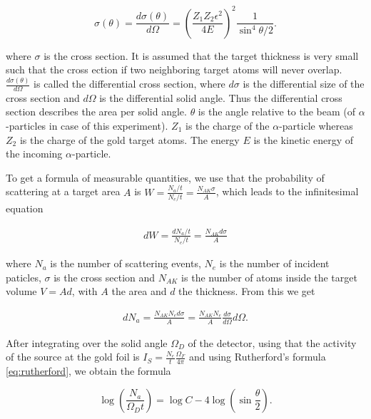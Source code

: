 \documentclass[a4paper]{article}
\begin{document}
\begin{equation}
\sigma(\theta) = \frac{d\sigma(\theta)}{d\Omega} = \left( \frac{Z_1 Z_2 \epsilon^2}{4E} \right)^2 \frac{1}{\sin^4{\theta / 2}}.
\label{eq:rutherford}
\end{equation}

where $\sigma$ is the cross section. It is assumed that the target thickness is very small such that the cross ection if two neighboring target atoms will never overlap. $\frac{d\sigma(\theta)}{d\Omega}$ is called the differential cross section, where $d\sigma$ is the differential size of the cross section and $d\Omega$ is the differential solid angle. Thus the differential cross section describes the area per solid angle. $\theta$ is the angle relative to the beam (of $\alpha$-particles in case of this experiment). $Z_1$ is the charge of the $\alpha$-particle whereas $Z_2$ is the charge of the gold target atoms. The energy $E$ is the kinetic energy of the incoming $\alpha$-particle.

To get a formula of measurable quantities, we use that the probability of scattering at a target area $A$ is $W = \frac{N_a / t}{N_e / t} = \frac{N_{AK} \sigma}{A}$, which leads to the infinitesimal equation

\begin{align}
dW = \frac{d N_a / t}{N_e / t} = \frac{N_{AK} d\sigma}{A}
\label{eq:dprob}
\end{align}

where $N_a$ is the number of scattering events, $N_e$ is the number of incident paticles, $\sigma$ is the cross section and $N_{AK}$ is the number of atoms inside the target volume $V = A d$, with $A$ the area and $d$ the thickness. From this we get

\begin{align}
d N_a = \frac{N_{AK} N_e d \sigma}{A} = \frac{N_{AK} N_e}{A} \frac{d \sigma}{d \Omega} d \Omega
\label{eq:dNa}.
\end{align}

After integrating over the solid angle $\Omega_D$ of the detector, using that the activity of the source at the gold foil is $I_S = \frac{N_e}{t} \frac{\Omega_F}{4 \pi}$ and using Rutherford's formula \eqref{eq:rutherford}, we obtain the formula

\begin{equation}
\log{\left( \frac{N_a}{\Omega_D t} \right)} = \log{C} - 4 \log{\left( \sin{\frac{\theta}{2}} \right)}.
\label{eq:log}
\end{equation}
\end{document}
